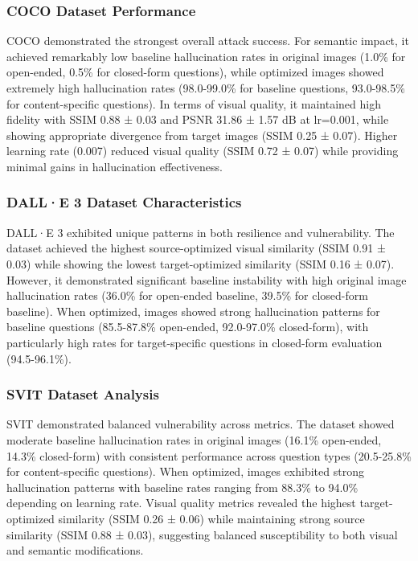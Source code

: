 \documentclass[runningheads]{llncs}
\begin{document}
\subsubsection{COCO Dataset Performance}
COCO demonstrated the strongest overall attack success. For semantic impact, it achieved remarkably low baseline hallucination rates in original images (1.0\% for open-ended, 0.5\% for closed-form questions), while optimized images showed extremely high hallucination rates (98.0-99.0\% for baseline questions, 93.0-98.5\% for content-specific questions). In terms of visual quality, it maintained high fidelity with SSIM 0.88 ± 0.03 and PSNR 31.86 ± 1.57 dB at lr=0.001, while showing appropriate divergence from target images (SSIM 0.25 ± 0.07). Higher learning rate (0.007) reduced visual quality (SSIM 0.72 ± 0.07) while providing minimal gains in hallucination effectiveness.

\subsubsection{DALL·E 3 Dataset Characteristics}
DALL·E 3 exhibited unique patterns in both resilience and vulnerability. The dataset achieved the highest source-optimized visual similarity (SSIM 0.91 ± 0.03) while showing the lowest target-optimized similarity (SSIM 0.16 ± 0.07). However, it demonstrated significant baseline instability with high original image hallucination rates (36.0\% for open-ended baseline, 39.5\% for closed-form baseline). When optimized, images showed strong hallucination patterns for baseline questions (85.5-87.8\% open-ended, 92.0-97.0\% closed-form), with particularly high rates for target-specific questions in closed-form evaluation (94.5-96.1\%).

\subsubsection{SVIT Dataset Analysis}
SVIT demonstrated balanced vulnerability across metrics. The dataset showed moderate baseline hallucination rates in original images (16.1\% open-ended, 14.3\% closed-form) with consistent performance across question types (20.5-25.8\% for content-specific questions). When optimized, images exhibited strong hallucination patterns with baseline rates ranging from 88.3\% to 94.0\% depending on learning rate. Visual quality metrics revealed the highest target-optimized similarity (SSIM 0.26 ± 0.06) while maintaining strong source similarity (SSIM 0.88 ± 0.03), suggesting balanced susceptibility to both visual and semantic modifications.
\end{document}
